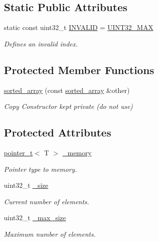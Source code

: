 \subsection*{Static Public Attributes}
\begin{DoxyCompactItemize}
\item 
static const uint32\+\_\+t \hyperlink{classcrap_1_1sorted__array_aa250f06b74b940be0c7e37e775e6765b}{I\+N\+V\+A\+L\+I\+D} = \hyperlink{crap__types_8h_ab5eb23180f7cc12b7d6c04a8ec067fdd}{U\+I\+N\+T32\+\_\+\+M\+A\+X}
\begin{DoxyCompactList}\small\item\em Defines an invalid index. \end{DoxyCompactList}\end{DoxyCompactItemize}
\subsection*{Protected Member Functions}
\begin{DoxyCompactItemize}
\item 
\hyperlink{classcrap_1_1sorted__array_abc66df9473d0f3fd1659f4cce186a9f3}{sorted\+\_\+array} (const \hyperlink{classcrap_1_1sorted__array}{sorted\+\_\+array} \&other)
\begin{DoxyCompactList}\small\item\em Copy Constructor kept private (do not use) \end{DoxyCompactList}\end{DoxyCompactItemize}
\subsection*{Protected Attributes}
\begin{DoxyCompactItemize}
\item 
\hyperlink{structcrap_1_1pointer__t}{pointer\+\_\+t}$<$ T $>$ \hyperlink{classcrap_1_1sorted__array_afa20ac100c5b603d0a522c94e7cd549f}{\+\_\+memory}
\begin{DoxyCompactList}\small\item\em Pointer type to memory. \end{DoxyCompactList}\item 
uint32\+\_\+t \hyperlink{classcrap_1_1sorted__array_ad33ca1ee9c30abf81658b3c2773ae9d1}{\+\_\+size}
\begin{DoxyCompactList}\small\item\em Current number of elements. \end{DoxyCompactList}\item 
uint32\+\_\+t \hyperlink{classcrap_1_1sorted__array_aea8cbb8c465d41aebecdf939113fa993}{\+\_\+max\+\_\+size}
\begin{DoxyCompactList}\small\item\em Maximum number of elements. \end{DoxyCompactList}\end{DoxyCompactItemize}


